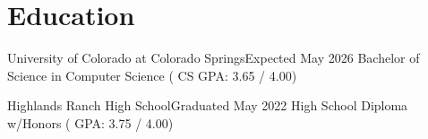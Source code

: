 \section{Education}
    \resumeSubHeadingListStart

    \resumeSubheading
    {University of Colorado at Colorado Springs}{Expected May 2026}
    {Bachelor of Science in Computer Science ( CS GPA: 3.65 / 4.00)}{}

    \resumeSubheading
    {Highlands Ranch High School}{Graduated May 2022}
    {High School Diploma w/Honors ( GPA: 3.75 / 4.00)}{}

    \resumeSubHeadingListEnd
